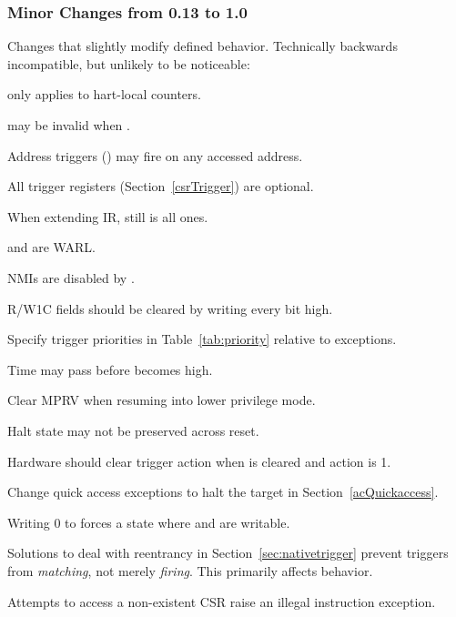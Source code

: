 \subsubsection{Minor Changes from 0.13 to 1.0}

\begin{steps}{Changes that slightly modify defined behavior. Technically backwards
incompatible, but unlikely to be noticeable:}
    \item \FcsrDcsrStopcount only applies to hart-local counters. 
    \item \FdmDmstatusVersion may be invalid when . 
    \item Address triggers (\RcsrMcontrol) may fire on any accessed address. 
    \item All trigger registers (Section~\ref{csrTrigger}) are optional. 
    \item When extending IR, \RdtmBypass still is all ones. 
    \item \FcsrDcsrEbreaks and \FcsrDcsrEbreaku are WARL. 
    \item NMIs are disabled by \FcsrDcsrStepie. 
    \item R/W1C fields should be cleared by writing every bit high. 
    \item Specify trigger priorities in Table~\ref{tab:priority} relative to exceptions. 
    \item Time may pass before \FdmDmcontrolDmactive becomes high. 
    \item Clear MPRV when resuming into lower privilege mode. 
    \item Halt state may not be preserved across reset. 
    \item Hardware should clear trigger action when \FcsrTdataOneDmode is
        cleared and action is 1. 
    \item Change quick access exceptions to halt the target in
    Section~\ref{acQuickaccess}. 
    \item Writing 0 to \RcsrTdataOne forces a state where \RcsrTdataTwo and
        \RcsrTdataThree are writable. 
    \item Solutions to deal with reentrancy in Section~\ref{sec:nativetrigger}
        prevent triggers from {\em matching}, not merely {\em firing}. This primarily
        affects \RcsrIcount behavior. 
    \item Attempts to access a non-existent CSR raise an illegal instruction
        exception. 
\end{steps}

